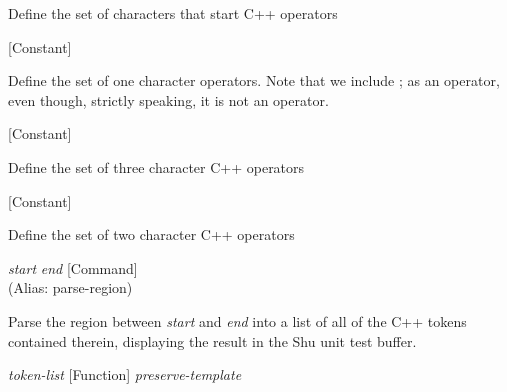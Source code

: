 \begin{doc-string}
Define the set of characters that start C++ operators
\end{doc-string}

\vspace{1em}
\noindent
{}
\usebox{\funcname}
 \hfill [Constant]

\begin{doc-string}
Define the set of one character operators.  Note that we include ; as
an operator, even though, strictly speaking, it is not an operator.
\end{doc-string}

\vspace{1em}
\noindent
{}
\usebox{\funcname}
 \hfill [Constant]

\begin{doc-string}
Define the set of three character C++ operators
\end{doc-string}

\vspace{1em}
\noindent
{}
\usebox{\funcname}
 \hfill [Constant]

\begin{doc-string}
Define the set of two character C++ operators
\end{doc-string}

\vspace{1em}
\noindent
{}
\usebox{\funcname}\emph{start} \emph{end}
 \hfill [Command]\\%
 (Alias: parse-region)

\begin{doc-string}
Parse the region between \emph{start} and \emph{end} into a list of all of the C++ tokens
contained therein, displaying the result in the Shu unit test buffer.
\end{doc-string}

\vspace{1em}
\noindent
{}
\usebox{\funcname}\emph{token-list}
 \hfill [Function]
\hspace*{\wd\funcname}\emph{preserve-template}

